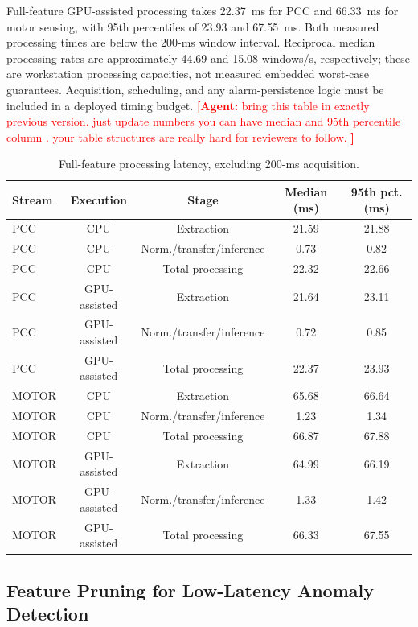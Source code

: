 \documentclass[letterpaper,journal]{IEEEtran}
\newcommand{\agent}[1]{%
    \textcolor{red}{\textbf{[Agent:} #1\textbf{]}}%
}
\begin{document}
Full-feature GPU-assisted processing takes 22.37~ms for PCC and 66.33~ms for motor sensing, with 95th percentiles of 23.93 and 67.55~ms. Both measured processing times are below the 200-ms window interval. Reciprocal median processing rates are approximately 44.69 and 15.08 windows/s, respectively; these are workstation processing capacities, not measured embedded worst-case guarantees. Acquisition, scheduling, and any alarm-persistence logic must be included in a deployed timing budget.
\agent{bring this table in exactly previous version. just update numbers you can have median and 95th percentile column . your table structures are really hard for reviewers to follow. }
\begin{table}[t]
\centering
\footnotesize
\caption{Full-feature processing latency, excluding 200-ms acquisition.}
\label{tab:runtime_latency}
\renewcommand{\arraystretch}{1.12}
\setlength{\tabcolsep}{3pt}
\begin{tabular}{lcccc}
\hline
Stream & Execution & Stage & Median (ms) & 95th pct. (ms) \\
\hline
PCC & CPU & Extraction & 21.59 & 21.88 \\
PCC & CPU & Norm./transfer/inference & 0.73 & 0.82 \\
PCC & CPU & Total processing & 22.32 & 22.66 \\
PCC & GPU-assisted & Extraction & 21.64 & 23.11 \\
PCC & GPU-assisted & Norm./transfer/inference & 0.72 & 0.85 \\
PCC & GPU-assisted & Total processing & 22.37 & 23.93 \\
MOTOR & CPU & Extraction & 65.68 & 66.64 \\
MOTOR & CPU & Norm./transfer/inference & 1.23 & 1.34 \\
MOTOR & CPU & Total processing & 66.87 & 67.88 \\
MOTOR & GPU-assisted & Extraction & 64.99 & 66.19 \\
MOTOR & GPU-assisted & Norm./transfer/inference & 1.33 & 1.42 \\
MOTOR & GPU-assisted & Total processing & 66.33 & 67.55 \\
\hline
\end{tabular}

\end{table}

\subsection{Feature Pruning for Low-Latency Anomaly Detection}
\label{sec:feature_pruning}
\end{document}
